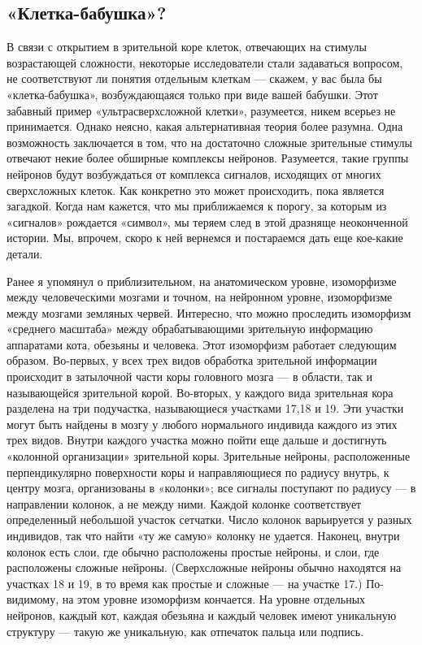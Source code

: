 \documentclass[../main.tex]{subfiles}
\begin{document}
\subsection{«Клетка-бабушка»?}

В связи с открытием в зрительной коре клеток, отвечающих на стимулы возрастающей сложности, некоторые исследователи стали задаваться вопросом, не соответствуют ли понятия отдельным клеткам --- скажем, у вас была бы «клетка-бабушка», возбуждающаяся только при виде вашей бабушки. Этот забавный пример «ультрасверхсложной клетки», разумеется, никем всерьез не принимается. Однако неясно, какая альтернативная теория более разумна. Одна возможность заключается в том, что на достаточно сложные зрительные стимулы отвечают некие более обширные комплексы нейронов. Разумеется, такие группы нейронов будут возбуждаться от комплекса сигналов, исходящих от многих сверхсложных клеток. Как конкретно это может происходить, пока является загадкой. Когда нам кажется, что мы приближаемся к порогу, за которым из «сигналов» рождается «символ», мы теряем след в этой дразняще неоконченной истории. Мы, впрочем, скоро к ней вернемся и постараемся дать еще кое-какие детали.

Ранее я упомянул о приблизительном, на анатомическом уровне, изоморфизме между человеческими мозгами и точном, на нейронном уровне, изоморфизме между мозгами земляных червей. Интересно, что можно проследить изоморфизм «среднего масштаба» между обрабатывающими зрительную информацию аппаратами кота, обезьяны и человека. Этот изоморфизм работает следующим образом. Во-первых, у всех трех видов обработка зрительной информации происходит в затылочной части коры головного мозга --- в области, так и называющейся зрительной корой. Во-вторых, у каждого вида зрительная кора разделена на три подучастка, называющиеся участками 17,18 и 19. Эти участки могут быть найдены в мозгу у любого нормального индивида каждого из этих трех видов. Внутри каждого участка можно пойти еще дальше и достигнуть «колонной организации» зрительной коры. Зрительные нейроны, расположенные перпендикулярно поверхности коры и направляющиеся по радиусу внутрь, к центру мозга, организованы в «колонки»; все сигналы поступают по радиусу --- в направлении колонок, а не между ними. Каждой колонке соответствует определенный небольшой участок сетчатки. Число колонок варьируется у разных индивидов, так что найти «ту же самую» колонку не удается. Наконец, внутри колонок есть слои, где обычно расположены простые нейроны, и слои, где расположены сложные нейроны. (Сверхсложные нейроны обычно находятся на участках 18 и 19, в то время как простые и сложные --- на участке 17.) По-видимому, на этом уровне изоморфизм кончается. На уровне отдельных нейронов, каждый кот, каждая обезьяна и каждый человек имеют уникальную структуру --- такую же уникальную, как отпечаток пальца или подпись.
\end{document}
